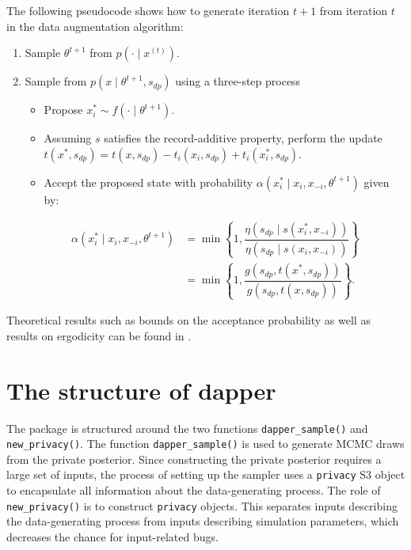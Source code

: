The following pseudocode shows how to generate iteration \(t+1\) from iteration \(t\)
in the data augmentation algorithm:

\begin{enumerate}
\def\labelenumi{\arabic{enumi}.}
\tightlist
\item
  Sample \(\theta^{t+1}\) from \(p(\cdot \mid x^{(t)})\).
\item
  Sample from \(p(x \mid \theta^{t+1}, s_{dp})\) using a three-step process

  \begin{itemize}
  \tightlist
  \item
    Propose \(x_{i}^{*} \sim f(\cdot \mid \theta^{t+1})\).
  \item
    Assuming \(s\) satisfies the record-additive property, perform the
    update \(t(x^*, s_{dp}) = t(x,s_{dp}) - t_i(x_i,s_{dp}) + t_{i}(x_i^*, s_{dp})\).
  \item
    Accept the proposed state with probability \(\alpha(x_i^* \mid x_i, x_{-i}, \theta^{t+1})\)
    given by:
  \end{itemize}

  \begin{equation*}
   \begin{aligned}
   \alpha(x_i^* \mid x_i, x_{-i}, \theta^{t+1}) &= \min \left\{ 1, \dfrac{\eta(s_{dp} \mid s(x_i^*, x_{-i}))}{\eta(s_{dp} \mid s(x_i, x_{-i}))} \right\}\\
   &= \min \left\{ 1, \dfrac{g(s_{dp}, t(x^*, s_{dp}))}{g(s_{dp}, t(x,s_{dp}))} \right\}.
   \end{aligned}
   \end{equation*}
\end{enumerate}

Theoretical results such as bounds on the acceptance probability as well as
results on ergodicity can be found in \citet{Ju2022}.

\section{The structure of dapper}\label{sec:structure}

The  package is structured around the two functions \texttt{dapper\_sample()} and
\texttt{new\_privacy()}. The function \texttt{dapper\_sample()} is used to generate MCMC draws from
the private posterior. Since constructing the private posterior requires
a large set of inputs, the process of setting up the
sampler uses a \texttt{privacy} S3 object to encapsulate
all information about the data-generating process. The role of \texttt{new\_privacy()} is to
construct \texttt{privacy} objects. This separates inputs describing the data-generating
process from inputs describing simulation parameters, which decreases
the chance for input-related bugs.

